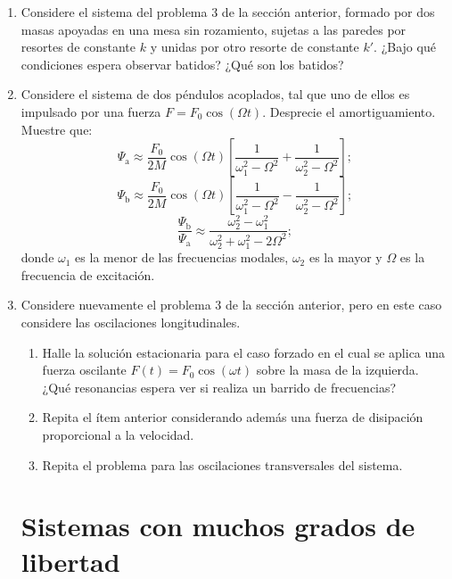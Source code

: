 \documentclass[11pt,spanish]{article}
\begin{document}
\begin{enumerate}

    \item Considere el sistema del problema 3 de la sección anterior, formado
    por dos masas apoyadas en una mesa sin rozamiento, sujetas a las paredes por
    resortes de constante $k$ y unidas por otro resorte de constante $k'$. ¿Bajo
    qué condiciones espera observar batidos? ¿Qué son los batidos?


    \item Considere el sistema de dos péndulos acoplados, tal que uno de ellos
    es impulsado por una fuerza $F=F_{0}\cos(\Omega t)$. Desprecie el
    amortiguamiento. Muestre que:
    \[
    \Psi_\text{a}\approx\frac{F_{0}}{2M}\cos(\Omega t)\left[\frac{1}{\omega_{1}^{2}-\Omega^{2}}+\frac{1}{\omega_{2}^{2}-\Omega^{2}}\right];
    \]
    \[
    \Psi_\text{b}\approx\frac{F_{0}}{2M}\cos(\Omega t)\left[\frac{1}{\omega_{1}^{2}-\Omega^{2}}-\frac{1}{\omega_{2}^{2}-\Omega^{2}}\right];
    \]
    \[
    \frac{\Psi_\text{b}}{\Psi_\text{a}}\approx\frac{\omega_{2}^{2}-\omega_{1}^{2}}{\omega_{2}^{2}+\omega_{1}^{2}-2\Omega^{2}};
    \]
    donde $\omega_{1}$ es la menor de las frecuencias modales, $\omega_{2}$
    es la mayor y $\Omega$ es la frecuencia de excitación.


    \item Considere nuevamente el problema 3 de la sección anterior, pero en
    este caso considere las oscilaciones longitudinales.
    
    \begin{enumerate}
        \item Halle la solución estacionaria para el caso forzado en el cual se
        aplica una fuerza oscilante $F(t) = F_0 \cos(\omega t)$ sobre la masa de
        la izquierda. ¿Qué resonancias espera ver si realiza un barrido de
        frecuencias?
        
        \item Repita el ítem anterior considerando además una fuerza de
        disipación proporcional a la velocidad.
        
        \item Repita el problema para las oscilaciones transversales del sistema.
    \end{enumerate}

    \section*{Sistemas con muchos grados de libertad}


\end{enumerate}
\end{document}
